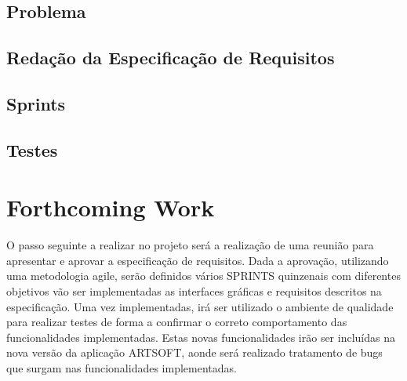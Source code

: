 \documentclass[sigplan]{acmart}
\begin{document}
\subsection{Problema} %

\subsection{Redação da Especificação de Requisitos}

\subsection{Sprints}

\subsection{Testes}

\section{Forthcoming Work} \label{sec:forthcomingwork}


O passo seguinte a realizar no projeto será a realização de uma reunião para apresentar e aprovar a especificação de requisitos. Dada a aprovação, utilizando uma metodologia agile, serão definidos vários SPRINTS quinzenais com diferentes objetivos vão ser implementadas as interfaces gráficas e requisitos descritos na especificação. Uma vez implementadas, irá ser utilizado o ambiente de qualidade para realizar testes de forma a confirmar o correto comportamento das funcionalidades implementadas. Estas novas funcionalidades irão ser incluídas na nova versão da aplicação ARTSOFT, aonde será realizado tratamento de bugs que surgam nas funcionalidades implementadas.



\end{document}
